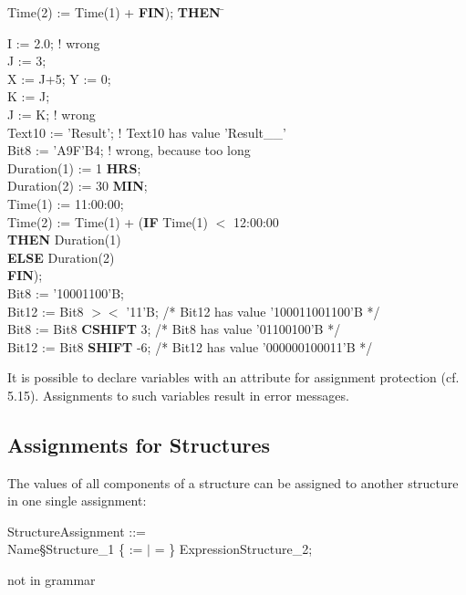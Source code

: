 \begin{tabbing}
Time(2) := Time(1) + \= {\bf FIN}); \= {\bf THEN} \= \kill

I := 2.0; \> \> \> ! wrong \\
J := 3;   \> \> \> \\
X := J+5; Y := 0; \> \> \> \\
K := J;   \> \> \> \\
J := K;   \> \> \> ! wrong\\
Text10 := 'Result'; \> \> \> ! Text10 has value 'Result\_\_' \\
Bit8 := 'A9F'B4;    \> \> \>! wrong, because too long \\
Duration(1) := 1 {\bf HRS}; \> \> \>\\
Duration(2) := 30 {\bf MIN}; \> \> \> \\
Time(1) := 11:00:00; \> \> \>\\
Time(2) := Time(1) + \> ({\bf IF} \> Time(1) $<$ 12:00:00 \> \\
       \>          \> {\bf THEN} Duration(1) \> \\
       \>          \> {\bf ELSE} Duration(2) \> \\
       \> {\bf FIN}); \> \> \\
Bit8 := '10001100'B; \> \> \> \\
Bit12 := Bit8 $><$ '11'B; \> \> \> /* Bit12 has value '100011001100'B */ \\
Bit8 := Bit8 {\bf CSHIFT} 3; \> \> \> /* Bit8 has value '01100100'B */ \\
Bit12 := Bit8 {\bf SHIFT} -6; \> \> \> /* Bit12 has value '000000100011'B */ \\
\end{tabbing}

It is possible to declare variables with an attribute for assignment
protection (cf. 5.15). Assignments to such variables result in error
messages.

\subsection{Assignments for Structures}   %

The values of all components of a structure can be assigned to another
structure in one single assignment:

\begin{front}
StructureAssignment ::=\\
\x Name\S Structure\_1 \{ := $\mid$ = \} ExpressionStructure\_2;
\end{front}
\begin{grammar}
not in grammar
\end{grammar}

